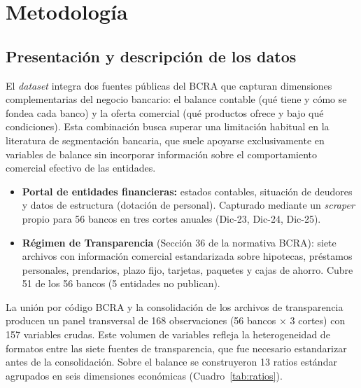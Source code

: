 \documentclass[11pt,a4paper]{article}
\begin{document}
\section{Metodología}
\label{sec:metodologia}

\subsection{Presentación y descripción de los datos}
El \textit{dataset} integra dos fuentes públicas del BCRA que capturan dimensiones complementarias del
negocio bancario: el balance contable (qué tiene y cómo se fondea cada banco) y la oferta comercial
(qué productos ofrece y bajo qué condiciones). Esta combinación busca superar una limitación habitual
en la literatura de segmentación bancaria, que suele apoyarse exclusivamente en variables de balance
sin incorporar información sobre el comportamiento comercial efectivo de las entidades.
\begin{itemize}
  \item \textbf{Portal de entidades financieras:} estados contables, situación de deudores y datos de
  estructura (dotación de personal). Capturado mediante un \textit{scraper} propio para 56 bancos en
  tres cortes anuales (Dic-23, Dic-24, Dic-25).
  \item \textbf{Régimen de Transparencia} (Sección 36 de la normativa BCRA): siete archivos con
  información comercial estandarizada sobre hipotecas, préstamos personales, prendarios, plazo fijo,
  tarjetas, paquetes y cajas de ahorro. Cubre 51 de los 56 bancos (5 entidades no publican).
\end{itemize}
La unión por código BCRA y la consolidación de los archivos de transparencia producen un
panel transversal de 168 observaciones (56 bancos $\times$ 3 cortes) con 157 variables crudas.
Este volumen de variables refleja la heterogeneidad de formatos entre las siete fuentes de
transparencia, que fue necesario estandarizar antes de la consolidación. Sobre el balance se
construyeron 13 ratios estándar agrupados en seis dimensiones económicas (Cuadro~\ref{tab:ratios}).
\end{document}
